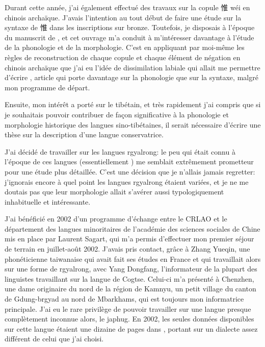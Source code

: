 \documentclass[oldfontcommands,oneside,a4paper,11pt]{memoir}
\newcommand{\zh}[1]{{\cn #1}}
\begin{document}
Durant cette année, j'ai également effectué des travaux sur la copule \zh{惟} wéi en chinois archaïque. J'avais l'intention au tout début de faire une étude sur la syntaxe de  \zh{惟} dans les inscriptions sur bronze. Toutefois, je disposais à l'époque du manuscrit de \citet{sagart99roc}, et cet ouvrage m'a conduit à m'intéresser davantage à l'étude de la phonologie et de la morphologie. C'est en appliquant par moi-même les règles de reconstruction de chaque copule et chaque élément de négation en chinois archaïque que j'ai eu l'idée de dissimilation labiale qui allait me permettre d'écrire \citet{jacques00ywij}, article qui porte davantage sur la phonologie que sur la syntaxe, malgré mon programme de départ.

Ensuite, mon intérêt a porté sur le tibétain, et très rapidement j'ai compris que si je souhaitais pouvoir contribuer de façon significative à la phonologie et morphologie historique des langues sino-tibétaines, il serait nécessaire  d'écrire une thèse sur la description d'une langue   conservatrice.

J'ai décidé de travailler sur les langues rgyalrong: le peu qui était connu à l'époque de ces langues (essentiellement \citealt{linxr93jiarong}) me semblait extrêmement prometteur pour une étude plus détaillée. C'est une décision que je n'allais jamais regretter: j'ignorais encore à quel point les langues rgyalrong étaient variées, et je ne me doutais pas que leur morphologie allait s'avérer aussi typologiquement inhabituelle et intéressante.

J'ai bénéficié en 2002 d'un programme d'échange entre le CRLAO et le département des langues minoritaires de l'académie des sciences sociales de Chine mis en place par Laurent Sagart, qui m'a permis d'effectuer mon premier séjour de terrain en juillet-août 2002. J'avais pris contact, grâce à Zhang Yueqin, une phonéticienne taiwanaise qui avait fait ses études en France et qui travaillait alors sur une forme de rgyalrong, avec Yang Dongfang, l'informateur de la plupart des linguistes travaillant sur la langue de Cogtse. Celui-ci m'a présenté à Chenzhen, une dame originaire du nord de la région de Kamnyu, un petit village du canton de Gdung-brgyad au nord de Mbarkhams, qui est toujours mon informatrice principale. J'ai eu le rare privilège de pouvoir travailler sur une langue presque complètement inconnue alors, le japhug. En 2002, les seules données disponibles sur cette langue étaient une dizaine de pages dans \citet{linxr93jiarong}, portant sur un dialecte assez différent de celui que j'ai choisi.
\end{document}
